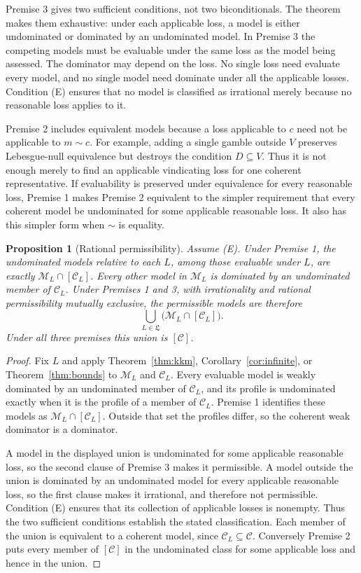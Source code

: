 \documentclass[11pt]{article}
\newtheorem{proposition}[theorem]{Proposition}
\theoremstyle{definition}
\theoremstyle{remark}
\newcommand{\M}{\mathcal M}
\newcommand{\C}{\mathcal C}
\begin{document}
Premise 3 gives two sufficient conditions, not two biconditionals. The theorem makes them exhaustive: under each applicable loss, a model is either undominated or dominated by an undominated model. In Premise 3 the competing models must be evaluable under the same loss as the model being assessed. The dominator may depend on the loss. No single loss need evaluate every model, and no single model need dominate under all the applicable losses. Condition (E) ensures that no model is classified as irrational merely because no reasonable loss applies to it.

Premise 2 includes equivalent models because a loss applicable to $c$ need not be applicable to $m\sim c$. For example, adding a single gamble outside $V$ preserves Lebesgue-null equivalence but destroys the condition $D\subseteq V$. Thus it is not enough merely to find an applicable vindicating loss for one coherent representative. If evaluability is preserved under equivalence for every reasonable loss, Premise 1 makes Premise 2 equivalent to the simpler requirement that every coherent model be undominated for some applicable reasonable loss. It also has this simpler form when $\sim$ is equality.

\begin{proposition}[Rational permissibility]\label{prop:permissible}
Assume (E). Under Premise 1, the undominated models relative to each $L$, among those evaluable under $L$, are exactly $\M_L\cap[\C_L]$. Every other model in $\M_L$ is dominated by an undominated member of $\C_L$. Under Premises 1 and 3, with irrationality and rational permissibility mutually exclusive, the permissible models are therefore
\[
 \bigcup_{L\in\mathfrak L}\bigl(\M_L\cap[\C_L]\bigr).
\]
Under all three premises this union is $[\C]$.
\end{proposition}
\begin{proof}
Fix $L$ and apply Theorem~\ref{thm:kkm}, Corollary~\ref{cor:infinite}, or Theorem~\ref{thm:bounds} to $\M_L$ and $\C_L$. Every evaluable model is weakly dominated by an undominated member of $\C_L$, and its profile is undominated exactly when it is the profile of a member of $\C_L$. Premise 1 identifies these models as $\M_L\cap[\C_L]$. Outside that set the profiles differ, so the coherent weak dominator is a dominator.

A model in the displayed union is undominated for some applicable reasonable loss, so the second clause of Premise 3 makes it permissible. A model outside the union is dominated by an undominated model for every applicable reasonable loss, so the first clause makes it irrational, and therefore not permissible. Condition (E) ensures that its collection of applicable losses is nonempty. Thus the two sufficient conditions establish the stated classification. Each member of the union is equivalent to a coherent model, since $\C_L\subseteq\C$. Conversely Premise 2 puts every member of $[\C]$ in the undominated class for some applicable loss and hence in the union.
\end{proof}
\end{document}
